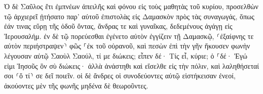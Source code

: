 \documentclass{openreader}
\begin{document}
Ὁ δὲ Σαῦλος ἔτι ἐμπνέων ἀπειλῆς καὶ φόνου εἰς τοὺς μαθητὰς τοῦ κυρίου, προσελθὼν τῷ ἀρχιερεῖ 
ᾐτήσατο παρ’ αὐτοῦ ἐπιστολὰς εἰς Δαμασκὸν πρὸς τὰς συναγωγάς, ὅπως ἐάν τινας εὕρῃ τῆς ὁδοῦ ὄντας, ἄνδρας τε καὶ γυναῖκας, δεδεμένους ἀγάγῃ εἰς Ἰερουσαλήμ. 
ἐν δὲ τῷ πορεύεσθαι ἐγένετο αὐτὸν ἐγγίζειν τῇ Δαμασκῷ, ⸂ἐξαίφνης τε αὐτὸν περιήστραψεν⸃ φῶς ⸀ἐκ τοῦ οὐρανοῦ, 
καὶ πεσὼν ἐπὶ τὴν γῆν ἤκουσεν φωνὴν λέγουσαν αὐτῷ Σαοὺλ Σαούλ, τί με διώκεις; 
εἶπεν δέ· Τίς εἶ, κύριε; ὁ ⸀δέ· Ἐγώ εἰμι Ἰησοῦς ὃν σὺ διώκεις· 
ἀλλὰ ἀνάστηθι καὶ εἴσελθε εἰς τὴν πόλιν, καὶ λαληθήσεταί σοι ⸂ὅ τί⸃ σε δεῖ ποιεῖν. 
οἱ δὲ ἄνδρες οἱ συνοδεύοντες αὐτῷ εἱστήκεισαν ἐνεοί, ἀκούοντες μὲν τῆς φωνῆς μηδένα δὲ θεωροῦντες. 
\end{document}
